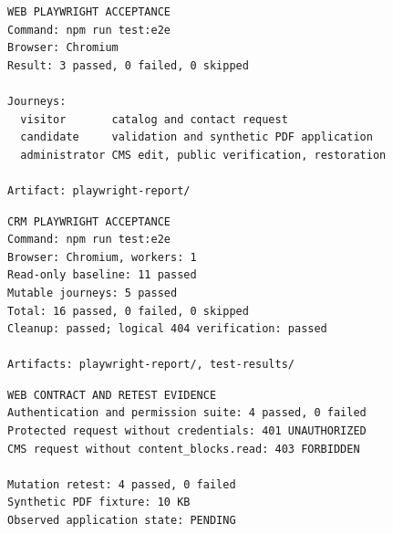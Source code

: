 \documentclass[letterpaper%
, oneside%
, 12pt%
, memoireprojet%
, english%
,creativecommons,hyperref, withAlgo2e %
]{thETS}
\begin{document}
\begin{samepage}
\begin{minipage}{0.96\linewidth}
\begin{lstlisting}[style=chaptercode,
    caption={Web Playwright smoke result recorded in the Web testing registry},
    label={fig:chapter6_web_playwright}]
WEB PLAYWRIGHT ACCEPTANCE
Command: npm run test:e2e
Browser: Chromium
Result: 3 passed, 0 failed, 0 skipped

Journeys:
  visitor       catalog and contact request
  candidate     validation and synthetic PDF application
  administrator CMS edit, public verification, restoration

Artifact: playwright-report/
\end{lstlisting}
\end{minipage}
\end{samepage}

\begin{samepage}
\begin{minipage}{0.96\linewidth}
\begin{lstlisting}[style=chaptercode,
    caption={CRM Playwright result recorded for read-only and mutable journeys},
    label={fig:chapter6_crm_playwright}]
CRM PLAYWRIGHT ACCEPTANCE
Command: npm run test:e2e
Browser: Chromium, workers: 1
Read-only baseline: 11 passed
Mutable journeys: 5 passed
Total: 16 passed, 0 failed, 0 skipped
Cleanup: passed; logical 404 verification: passed

Artifacts: playwright-report/, test-results/
\end{lstlisting}
\end{minipage}
\end{samepage}

\begin{samepage}
\begin{minipage}{0.96\linewidth}
\begin{lstlisting}[style=chaptercode,
    caption={Permission and retest outcomes recorded in the Web integration evidence},
    label={fig:chapter6_permission_retest}]
WEB CONTRACT AND RETEST EVIDENCE
Authentication and permission suite: 4 passed, 0 failed
Protected request without credentials: 401 UNAUTHORIZED
CMS request without content_blocks.read: 403 FORBIDDEN

Mutation retest: 4 passed, 0 failed
Synthetic PDF fixture: 10 KB
Observed application state: PENDING
\end{lstlisting}
\end{minipage}
\end{samepage}
\end{document}
